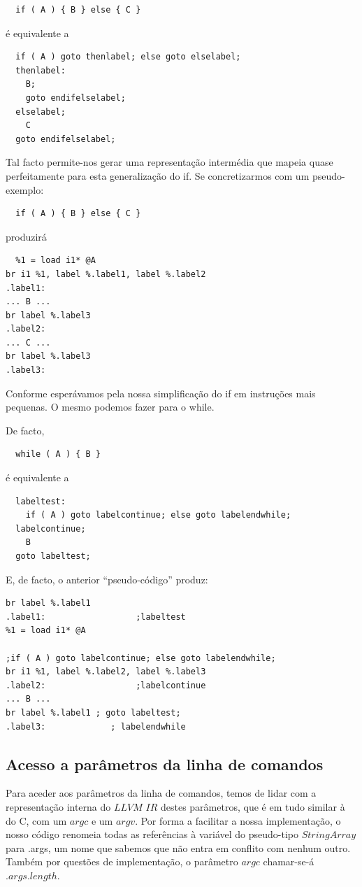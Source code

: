 \documentclass[11pt,a4paper]{article}
\begin{document}
\begin{lstlisting}
  if ( A ) { B } else { C }
\end{lstlisting}

é equivalente a

\begin{lstlisting}
  if ( A ) goto thenlabel; else goto elselabel;
  thenlabel:
    B;
    goto endifelselabel;
  elselabel;
    C
  goto endifelselabel;
\end{lstlisting}

Tal facto permite-nos gerar uma representação intermédia que mapeia quase perfeitamente para esta generalização do if. Se concretizarmos com um pseudo-exemplo:

\begin{lstlisting}
  if ( A ) { B } else { C }
\end{lstlisting}

produzirá

\begin{lstlisting}
  %1 = load i1* @A
br i1 %1, label %.label1, label %.label2
.label1:
... B ...
br label %.label3
.label2:
... C ...
br label %.label3
.label3:
\end{lstlisting}

Conforme esperávamos pela nossa simplificação do if em instruções mais pequenas. O mesmo podemos fazer para o while.

De facto,

\begin{lstlisting}
  while ( A ) { B }
\end{lstlisting}

é equivalente a

\begin{lstlisting}
  labeltest:
    if ( A ) goto labelcontinue; else goto labelendwhile;
  labelcontinue;
    B
  goto labeltest;
\end{lstlisting}

E, de facto, o anterior ``pseudo-código'' produz:

\begin{lstlisting}
br label %.label1
.label1:                  ;labeltest
%1 = load i1* @A

;if ( A ) goto labelcontinue; else goto labelendwhile;
br i1 %1, label %.label2, label %.label3
.label2:                  ;labelcontinue
... B ... 
br label %.label1 ; goto labeltest;
.label3:             ; labelendwhile
\end{lstlisting}

\subsection{Acesso a parâmetros da linha de comandos}
Para aceder aos parâmetros da linha de comandos, temos de lidar com a representação interna do $LLVM$ $IR$ destes parâmetros, que é em tudo similar à do C, com um $argc$ e um $argv$. Por forma a facilitar a nossa implementação, o nosso código renomeia todas as referências à variável do pseudo-tipo $StringArray$ para .args, um nome que sabemos que não entra em conflito com nenhum outro. Também por questões de implementação, o parâmetro $argc$ chamar-se-á $.args.length$.
\end{document}
